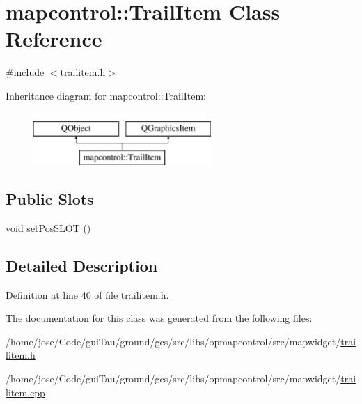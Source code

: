 \hypertarget{classmapcontrol_1_1_trail_item}{\section{mapcontrol\-:\-:Trail\-Item Class Reference}
\label{classmapcontrol_1_1_trail_item}
}


{\ttfamily \#include $<$trailitem.\-h$>$}

Inheritance diagram for mapcontrol\-:\-:Trail\-Item\-:\begin{figure}[H]
\begin{center}
\leavevmode
\includegraphics[height=2.000000cm]{classmapcontrol_1_1_trail_item}
\end{center}
\end{figure}
\subsection*{Public Slots}
\begin{DoxyCompactItemize}
\item 
\hyperlink{group___u_a_v_objects_plugin_ga444cf2ff3f0ecbe028adce838d373f5c}{void} \hyperlink{group___o_p_map_widget_ga777b7b40dc91ba179a19cc547adeecab}{set\-Pos\-S\-L\-O\-T} ()
\end{DoxyCompactItemize}


\subsection{Detailed Description}


Definition at line 40 of file trailitem.\-h.



The documentation for this class was generated from the following files\-:\begin{DoxyCompactItemize}
\item 
/home/jose/\-Code/gui\-Tau/ground/gcs/src/libs/opmapcontrol/src/mapwidget/\hyperlink{trailitem_8h}{trailitem.\-h}\item 
/home/jose/\-Code/gui\-Tau/ground/gcs/src/libs/opmapcontrol/src/mapwidget/\hyperlink{trailitem_8cpp}{trailitem.\-cpp}\end{DoxyCompactItemize}
